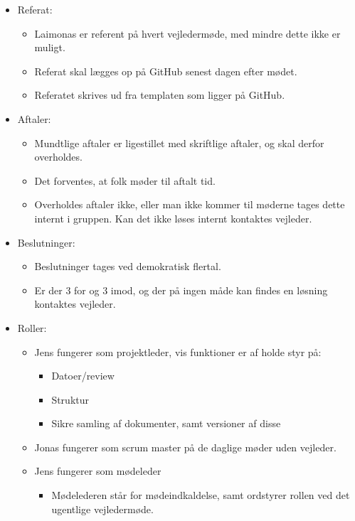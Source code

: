 \begin{itemize}
		\item Referat:
			\begin{itemize}
			\item Laimonas er referent på hvert vejledermøde, med mindre dette ikke er muligt.
			\item Referat skal lægges op på GitHub senest dagen efter mødet.
			\item Referatet skrives ud fra templaten som ligger på GitHub.
			\end{itemize}
		\item Aftaler:
			\begin{itemize}
			\item Mundtlige aftaler er ligestillet med skriftlige aftaler, og skal derfor overholdes.
			\item Det forventes, at folk møder til aftalt tid.
			\item Overholdes aftaler ikke, eller man ikke kommer til møderne tages dette internt i gruppen. Kan det ikke løses internt kontaktes vejleder. 
			\end{itemize}
		\item Beslutninger:
			\begin{itemize}
			\item Beslutninger tages ved demokratisk flertal.
			\item Er der 3 for og 3 imod, og der på ingen måde kan findes en løsning kontaktes vejleder.
			\end{itemize}
		\item Roller:
			\begin{itemize}
				\item Jens fungerer som projektleder, vis funktioner er af holde styr på:
				\begin{itemize}
					\item Datoer/review
					\item Struktur
					\item Sikre samling af dokumenter, samt versioner af disse
				\end{itemize}
				\item Jonas fungerer som scrum master på de daglige møder uden vejleder. 
				\item Jens fungerer som mødeleder
				\begin{itemize}
					\item Mødelederen står for mødeindkaldelse, samt ordstyrer rollen ved det ugentlige vejledermøde. 
				\end{itemize} 
			\end{itemize}

\end{itemize}
